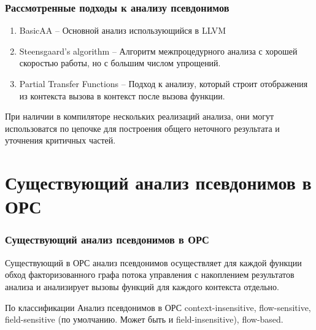 \documentclass[utf8,russian]{beamer}
\begin{document}
\begin{frame}
\frametitle{Рассмотренные подходы к анализу псевдонимов}

\begin{enumerate}
\item BasicAA -- Основной анализ использующийся в LLVM
\item Steensgaard’s algorithm -- Алгоритм межпроцедурного анализа с хорошей скоростью работы, но с большим числом упрощений.
\item Partial Transfer Functions -- Подход к анализу, который строит отображения из контекста вызова в контекст после вызова функции.
\end{enumerate}

При наличии в компиляторе нескольких реализаций анализа, они могут использоватся по цепочке для построения общего неточного результата и уточнения критичных частей.
\end{frame}

\section{Существующий анализ псевдонимов в ОРС}

\begin{frame}
\frametitle{Существующий анализ псевдонимов в ОРС}

\begin{block}{}
Существующий в ОРС анализ псевдонимов осуществляет для каждой функции обход факторизованного графа потока управления с накоплением результатов анализа и анализирует вызовы функций для каждого контекста отдельно.
\end{block}

\begin{block}{По классификации}
Анализ псевдонимов в ОРС context-insensitive, flow-sensitive, field-sensitive (по умолчанию. Может быть и field-insensitive), flow-based.
\end{block}

\end{frame}

\end{document}
